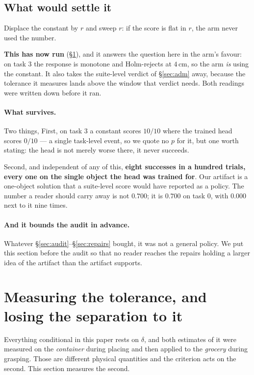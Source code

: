 \documentclass[10pt,twocolumn]{article}
\begin{document}
\subsection{What would settle it}
\label{sec:whatwouldsettle}
 Displace the constant by $r$ and sweep $r$:
if the score is flat in $r$, the arm never used the number.

\textbf{This has now run} (\S\ref{sec:e2}), and it answers the question here in
the arm's favour: on task $3$ the response is monotone and Holm-rejects at
$4$\,cm, so the arm \emph{is} using the constant. It also takes the
suite-level verdict of \S\ref{sec:adm} away, because the tolerance it measures
lands above the window that verdict needs. Both readings were written down
before it ran.

\paragraph{What survives.} Two things, First, on task $3$ a constant scores $10/10$ where the trained head scores
$0/10$ --- a single task-level event, so we quote no $p$ for it, but one worth stating: the head is not merely worse there, it never succeeds.

Second, and independent of any of this, \textbf{eight successes in a hundred
trials, every one on the single object the head was trained for}. Our artifact is a
one-object solution that a suite-level score would have reported as a policy.
The number a reader should carry away is not $0.700$; it is $0.700$ on task $0$,
with $0.000$ next to it nine times.

\paragraph{And it bounds the audit in advance.} Whatever
\S\ref{sec:audit}--\S\ref{sec:repairs} bought, it was not a general policy. We
put this section before the audit so that no reader reaches the repairs holding
a larger idea of the artifact than the artifact supports.

\section{Measuring the tolerance, and losing the separation to it}
\label{sec:e2}

Everything conditional in this paper rests on $\delta$, and both estimates of
it were measured on the \emph{container} during placing and then applied to the
\emph{grocery} during grasping. Those are different physical quantities and the
criterion acts on the second. This section measures the second.
\end{document}
